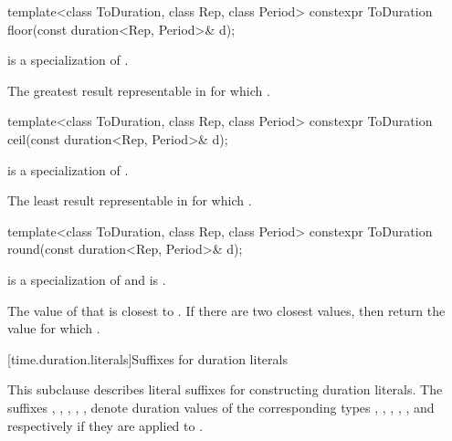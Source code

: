 %
\begin{itemdecl}
template<class ToDuration, class Rep, class Period>
  constexpr ToDuration floor(const duration<Rep, Period>& d);
\end{itemdecl}

\begin{itemdescr}
\pnum
\constraints
{} is a specialization of .

\pnum
\returns
The greatest result  representable in 
for which .
\end{itemdescr}

%
\begin{itemdecl}
template<class ToDuration, class Rep, class Period>
  constexpr ToDuration ceil(const duration<Rep, Period>& d);
\end{itemdecl}

\begin{itemdescr}
\pnum
\constraints
{} is a specialization of .

\pnum
\returns
The least result  representable in 
for which .
\end{itemdescr}

%
\begin{itemdecl}
template<class ToDuration, class Rep, class Period>
  constexpr ToDuration round(const duration<Rep, Period>& d);
\end{itemdecl}

\begin{itemdescr}
\pnum
\constraints
{} is a specialization of  and
 is .

\pnum
\returns
The value of  that is closest to .
If there are two closest values, then return the value 
for which .
\end{itemdescr}

[time.duration.literals]{Suffixes for duration literals}

\pnum
This subclause describes literal suffixes for constructing duration literals. The
suffixes , , , , , 
denote duration values of the corresponding types , ,
, , , and 
respectively if they are applied to .

